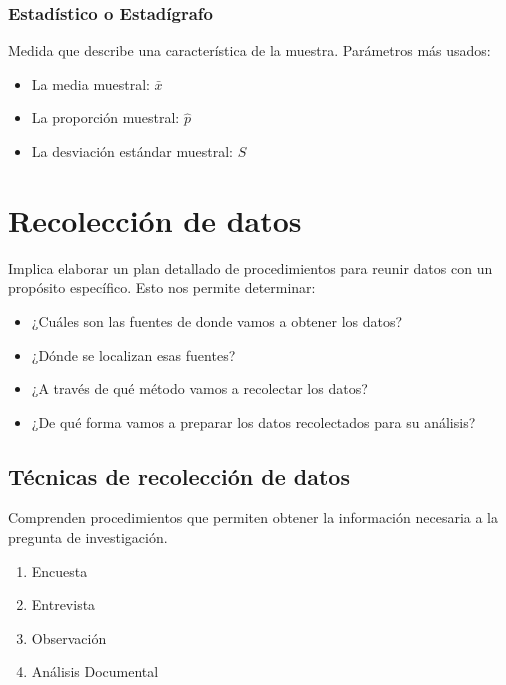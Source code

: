 \documentclass{article}
\begin{document}
        \subsubsection{Estadístico o Estadígrafo}
            Medida que describe una característica de la muestra.
            Parámetros más usados:
            \begin{itemize}
            \item La media muestral: $\bar{x}$
            \item La proporción muestral: $\hat{p}$
            \item La desviación estándar muestral: $S$
            \end{itemize}
            

\section{Recolección de datos}
    Implica elaborar un plan detallado de procedimientos para reunir datos con un propósito específico. Esto nos permite determinar:

    \begin{itemize}
    \item ¿Cuáles son las fuentes de donde vamos a obtener los datos?
    \item ¿Dónde se localizan esas fuentes?
    \item ¿A través de qué método vamos a recolectar los datos?
    \item ¿De qué forma vamos a preparar los datos recolectados para su análisis?
    \end{itemize}

    \subsection{Técnicas de recolección de datos}
        Comprenden procedimientos que permiten obtener la información necesaria a la pregunta de investigación.
        
        \begin{multicols}{2}
        \begin{enumerate}[label=\arabic*.]
        \item Encuesta
        \item Entrevista
        \item Observación
        \item Análisis Documental
        \end{enumerate}
        \end{multicols}
\end{document}
